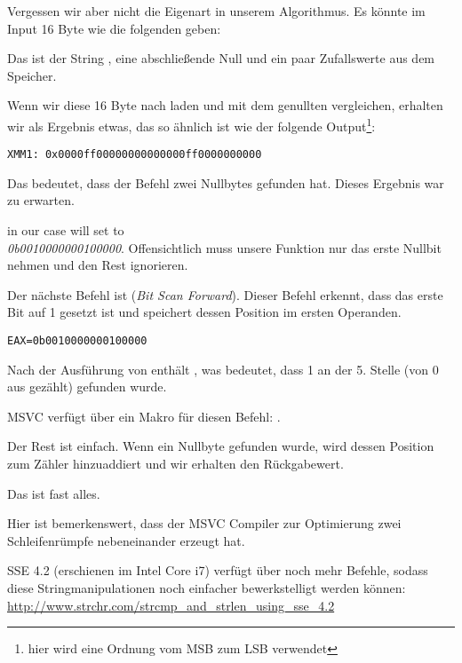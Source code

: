 Vergessen wir aber nicht die Eigenart in unserem Algorithmus. Es könnte im Input 16 Byte wie die folgenden geben:


Das ist der String , eine abschließende Null und ein paar Zufallswerte aus dem Speicher.

Wenn wir diese 16 Byte nach  laden und mit dem genullten  vergleichen, erhalten wir als Ergebnis etwas,
das so ähnlich ist wie der folgende Output\footnote{hier wird eine Ordnung vom \ac{MSB} zum \ac{LSB} verwendet}:

\begin{verbatim}
XMM1: 0x0000ff00000000000000ff0000000000
\end{verbatim}

Das bedeutet, dass der Befehl zwei Nullbytes gefunden hat. Dieses Ergebnis war zu erwarten.
 
 in our case will set \EAX to\\
\emph{0b0010000000100000}.
Offensichtlich muss unsere Funktion nur das erste Nullbit nehmen und den Rest ignorieren.

\label{instruction_BSF}
Der nächste Befehl ist  (\emph{Bit Scan Forward}). 
Dieser Befehl erkennt, dass das erste Bit auf 1 gesetzt ist und speichert dessen Position im ersten Operanden.

\begin{verbatim}
EAX=0b0010000000100000
\end{verbatim}
Nach der Ausführung von  enthält , was bedeutet, dass 1 an der 5. Stelle (von 0 aus gezählt)
gefunden wurde.

MSVC verfügt über ein Makro für diesen Befehl: .

Der Rest ist einfach. Wenn ein Nullbyte gefunden wurde, wird dessen Position zum Zähler hinzuaddiert und wir erhalten
den Rückgabewert.

Das ist fast alles.

Hier ist bemerkenswert, dass der MSVC Compiler zur Optimierung zwei Schleifenrümpfe nebeneinander erzeugt hat.

SSE 4.2 (erschienen im Intel Core i7) verfügt über noch mehr Befehle, sodass diese Stringmanipulationen noch einfacher
bewerkstelligt werden können: \url{http://www.strchr.com/strcmp_and_strlen_using_sse_4.2}

